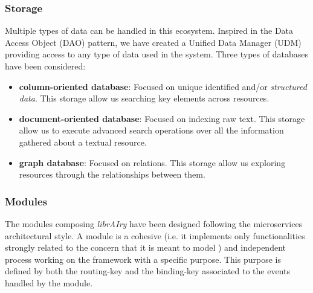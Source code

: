 \subsubsection{Storage}

Multiple types of data can be handled in this ecosystem. Inspired in the Data Access Object (DAO) pattern, we have created a Unified Data Manager (UDM) providing access to any type of data used in the system.  Three types of databases have been considered:
\begin{itemize}
	\item \textbf{column-oriented database}: Focused on unique identified and/or \textit{structured data}. This storage allow us searching key elements across resources. 
	\item \textbf{document-oriented database}: Focused on indexing raw text. This storage allow us to execute advanced search operations over all the information gathered about a textual resource. 
    \item \textbf{graph database}: Focused on relations. This storage allow us exploring resources through the relationships between them.
\end{itemize}

\subsubsection{Modules}
The modules composing \textit{librAIry} have been designed following the microservices architectural style. A module is a cohesive (i.e. it implements only functionalities strongly related to the concern that it is meant to model \cite{Dragoni2016}) and independent process working on the framework with a specific purpose. This purpose is defined by both the routing-key and the binding-key associated to the events handled by the module. 


